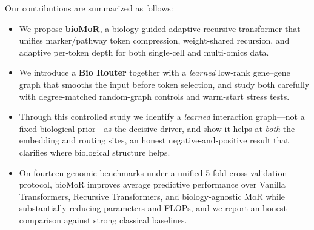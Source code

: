 \documentclass[letterpaper]{article}
\begin{document}
Our contributions are summarized as follows:

\begin{itemize}
    \item We propose \textbf{bioMoR}, a biology-guided adaptive recursive transformer that unifies marker/pathway token compression, weight-shared recursion, and adaptive per-token depth for both single-cell and multi-omics data.

    \item We introduce a \textbf{Bio Router} together with a \emph{learned} low-rank gene--gene graph that smooths the input before token selection, and study both carefully with degree-matched random-graph controls and warm-start stress tests.

    \item Through this controlled study we identify a \emph{learned} interaction graph---not a fixed biological prior---as the decisive driver, and show it helps at \emph{both} the embedding and routing sites, an honest negative-and-positive result that clarifies where biological structure helps.

    \item On fourteen genomic benchmarks under a unified 5-fold cross-validation protocol, bioMoR improves average predictive performance over Vanilla Transformers, Recursive Transformers, and biology-agnostic MoR while substantially reducing parameters and FLOPs, and we report an honest comparison against strong classical baselines.
\end{itemize}
\end{document}
